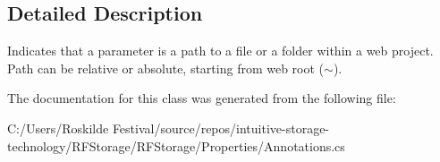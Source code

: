 \subsection{Detailed Description}
Indicates that a parameter is a path to a file or a folder within a web project. Path can be relative or absolute, starting from web root ($\sim$). 



The documentation for this class was generated from the following file\+:\begin{DoxyCompactItemize}
\item 
C\+:/\+Users/\+Roskilde Festival/source/repos/intuitive-\/storage-\/technology/\+R\+F\+Storage/\+R\+F\+Storage/\+Properties/Annotations.\+cs\end{DoxyCompactItemize}
